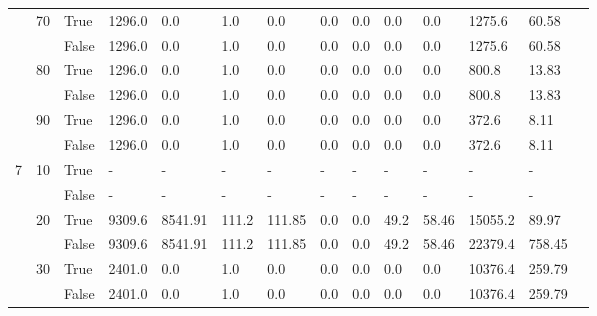 \begin{landscape}
\begin{small}
\begin{longtable}[c]{@{}lll|ll|ll|ll|ll|lll@{}}
   & 70 & True  & 1296.0          & 0.0            & 1.0           & 0.0           & 0.0           & 0.0           & 0.0           & 0.0           & 1275.6        & 60.58       &  \\
   &    & False & 1296.0          & 0.0            & 1.0           & 0.0           & 0.0           & 0.0           & 0.0           & 0.0           & 1275.6        & 60.58       &  \\
   & 80 & True  & 1296.0          & 0.0            & 1.0           & 0.0           & 0.0           & 0.0           & 0.0           & 0.0           & 800.8         & 13.83       &  \\
   &    & False & 1296.0          & 0.0            & 1.0           & 0.0           & 0.0           & 0.0           & 0.0           & 0.0           & 800.8         & 13.83       &  \\
   & 90 & True  & 1296.0          & 0.0            & 1.0           & 0.0           & 0.0           & 0.0           & 0.0           & 0.0           & 372.6         & 8.11        &  \\
   &    & False & 1296.0          & 0.0            & 1.0           & 0.0           & 0.0           & 0.0           & 0.0           & 0.0           & 372.6         & 8.11        &  \\
  \midrule
7  & 10 & True  & -               & -              & -             & -             & -             & -             & -             & -             & -             & -           &  \\
   &    & False & -               & -              & -             & -             & -             & -             & -             & -             & -             & -           &  \\
   & 20 & True  & 9309.6          & 8541.91        & 111.2         & 111.85        & 0.0           & 0.0           & 49.2          & 58.46         & 15055.2       & 89.97       &  \\
   &    & False & 9309.6          & 8541.91        & 111.2         & 111.85        & 0.0           & 0.0           & 49.2          & 58.46         & 22379.4       & 758.45      &  \\
   & 30 & True  & 2401.0          & 0.0            & 1.0           & 0.0           & 0.0           & 0.0           & 0.0           & 0.0           & 10376.4       & 259.79      &  \\
   &    & False & 2401.0          & 0.0            & 1.0           & 0.0           & 0.0           & 0.0           & 0.0           & 0.0           & 10376.4       & 259.79      &  \\

\end{longtable}
\end{small}
\end{landscape}

